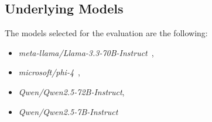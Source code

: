 \subsection{Underlying Models}
\label{sec:exp_qa}
The models selected for the evaluation are the following:
\begin{itemize}
    \item \textit{meta-llama/Llama-3.3-70B-Instruct}~\cite{qwen2025qwen25technicalreport},
    \item \textit{microsoft/phi-4}~\cite{abdin2024phi4technicalreport},
    \item \textit{Qwen/Qwen2.5-72B-Instruct},
    \item \textit{Qwen/Qwen2.5-7B-Instruct}~\cite{qwen2025qwen25technicalreport}
\end{itemize}




